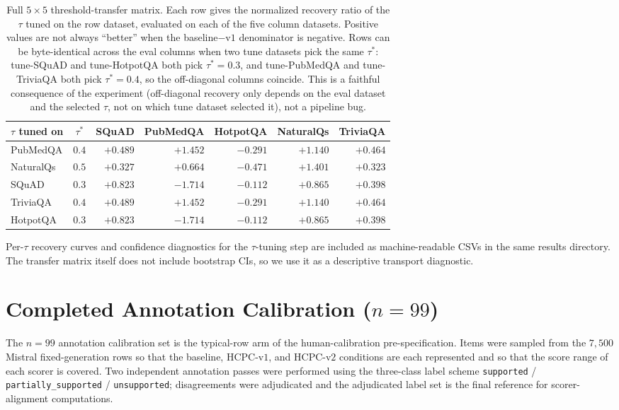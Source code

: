 \documentclass[11pt]{article}
\begin{document}
\begin{table}[!htb]
\centering
\caption{Full $5 \times 5$ threshold-transfer matrix. Each row gives
the normalized recovery ratio of the $\tau$ tuned on the row dataset,
evaluated on each of the five column datasets. Positive values are not
always ``better'' when the baseline$-$v$1$ denominator is negative.
Rows can be byte-identical across the eval columns when two tune
datasets pick the same $\tau^\ast$: tune-SQuAD and tune-HotpotQA both
pick $\tau^\ast = 0.3$, and tune-PubMedQA and tune-TriviaQA both pick
$\tau^\ast = 0.4$, so the off-diagonal columns coincide. This is a
faithful consequence of the experiment (off-diagonal recovery only
depends on the eval dataset and the selected $\tau$, not on which tune
dataset selected it), not a pipeline bug.}
\label{tab:supp:threshold_transfer_full}
\footnotesize
\begin{tabular}{lcrrrrr}
\toprule
$\tau$ tuned on & $\tau^\ast$ & SQuAD & PubMedQA & HotpotQA & NaturalQs & TriviaQA \\
\midrule
PubMedQA  & $0.4$ & $+0.489$ & $+1.452$ & $-0.291$ & $+1.140$ & $+0.464$ \\
NaturalQs & $0.5$ & $+0.327$ & $+0.664$ & $-0.471$ & $+1.401$ & $+0.323$ \\
SQuAD     & $0.3$ & $+0.823$ & $-1.714$ & $-0.112$ & $+0.865$ & $+0.398$ \\
TriviaQA  & $0.4$ & $+0.489$ & $+1.452$ & $-0.291$ & $+1.140$ & $+0.464$ \\
HotpotQA  & $0.3$ & $+0.823$ & $-1.714$ & $-0.112$ & $+0.865$ & $+0.398$ \\
\bottomrule
\end{tabular}
\end{table}

Per-$\tau$ recovery curves and confidence diagnostics for the
$\tau$-tuning step are included as machine-readable CSVs in the same
results directory. The transfer matrix itself does not include
bootstrap CIs, so we use it as a descriptive transport diagnostic.

\section{Completed Annotation Calibration ($n=99$)}
\label{supp:human_calibration}

The $n=99$ annotation calibration set is the typical-row arm of the
human-calibration pre-specification. Items were sampled from the
$7{,}500$ Mistral fixed-generation rows so that the baseline,
HCPC-v$1$, and HCPC-v$2$ conditions are each represented and so that
the score range of each scorer is covered. Two independent annotation
passes were performed using the three-class label scheme
\texttt{supported} / \texttt{partially\_supported} / \texttt{unsupported};
disagreements were adjudicated and the adjudicated label set is the
final reference for scorer-alignment computations.
\end{document}

